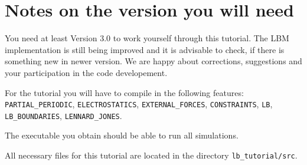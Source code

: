 \section*{Notes on the \ES{} version you will need}
You need at least \ES{} Version 3.0 to work yourself through this 
tutorial. The LBM implementation is still being improved and it is advisable
to check, if there is something new in newer version. We are happy 
about corrections, suggestions and your participation in the code developement.

For the tutorial you will have to compile in the following  features:
\lstinline|PARTIAL_PERIODIC|, \lstinline|ELECTROSTATICS|, \lstinline|EXTERNAL_FORCES|, \lstinline|CONSTRAINTS|,
\lstinline|LB|, \lstinline|LB_BOUNDARIES|, \lstinline|LENNARD_JONES|.

The executable you obtain should be able to run all simulations.

All necessary files for this tutorial are located in the directory \lstinline|lb_tutorial/src|.



